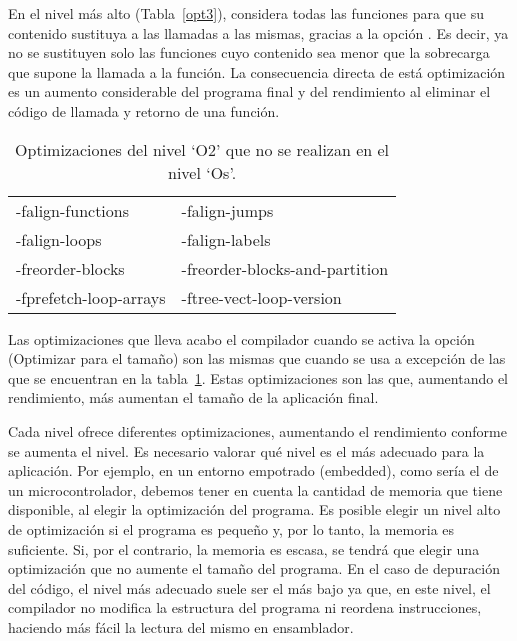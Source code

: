En el nivel más alto (Tabla~\ref{opt3}),  considera todas las funciones para que su contenido sustituya a las llamadas a las mismas, gracias a la opción . Es decir, ya no se sustituyen solo las funciones cuyo contenido sea menor que la sobrecarga que supone la llamada a la función. La consecuencia directa de está optimización es un aumento considerable del programa final y del rendimiento al eliminar el código de llamada y retorno de una función. 

\begin{table}[htb]
\begin{center}
	\begin{tabular}{|ll|}
		\hline
		-falign-functions & -falign-jumps\\
		-falign-loops & -falign-labels\\
		-freorder-blocks & -freorder-blocks-and-partition\\
		-fprefetch-loop-arrays & -ftree-vect-loop-version\\
		\hline
\end{tabular}
\end{center}
\caption{Optimizaciones del nivel `O2' que no se realizan en el nivel `Os'.}
\label{opt_s}
\end{table}

Las optimizaciones que lleva acabo el compilador cuando se activa la opción  (Optimizar para el tamaño) son las mismas que cuando se usa  a excepción de las que se encuentran en la tabla~\ref{opt_s}. Estas optimizaciones son las que, aumentando el rendimiento, más aumentan el tamaño de la aplicación final.

Cada nivel ofrece diferentes optimizaciones, aumentando el rendimiento conforme se aumenta el nivel. Es necesario valorar qué nivel es el más adecuado para la aplicación. Por ejemplo, en un entorno empotrado (embedded), como sería el de un microcontrolador, debemos tener en cuenta la cantidad de memoria que tiene disponible, al elegir la optimización del programa. Es posible elegir un nivel alto de optimización si el programa es pequeño y, por lo tanto, la memoria es suficiente. Si, por el contrario, la memoria es escasa, se tendrá que elegir una optimización que no aumente el tamaño del programa. En el caso de depuración del código, el nivel más adecuado suele ser el más bajo ya que, en este nivel, el compilador no modifica la estructura del programa ni reordena instrucciones, haciendo más fácil la lectura del mismo en ensamblador.

